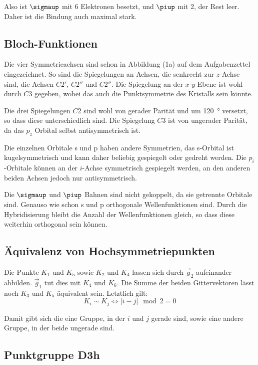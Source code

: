 Also ist $\sigmaup$ mit 6 Elektronen besetzt, und $\piup$ mit 2, der Rest leer.
Daher ist die Bindung auch maximal stark.

\subsection{Bloch-Funktionen}

Die vier Symmetrieachsen sind schon in Abbildung (1a) auf dem Aufgabenzettel
eingezeichnet. So sind die Spiegelungen an Achsen, die senkrecht zur $z$-Achse
sind, die Achsen $C2'$, $C2''$ und $C2''$. Die Spiegelung an der $x$-$y$-Ebene
ist wohl durch $C3$ gegeben, wobei das auch die Punktsymmetrie des Kristalls
sein könnte.

Die drei Spiegelungen $C2$ sind wohl von gerader Parität und um
\SI{120}{\degree} versetzt, so dass diese unterschiedlich sind. Die Spiegelung
$C3$ ist von ungerader Parität, da das $p_z$ Orbital selbst antisymmetrisch
ist.

Die einzelnen Orbitale s und p haben andere Symmetrien, das s-Orbital ist
kugelsymmetrisch und kann daher beliebig gespiegelt oder gedreht werden. Die
$p_i$-Orbitale können an der $i$-Achse symmetrisch gespiegelt werden, an den
anderen beiden Achsen jedoch nur antisymmetrisch.

Die $\sigmaup$ und $\piup$ Bahnen sind nicht gekoppelt, da sie getrennte
Orbitale sind. Genauso wie schon s und p orthogonale Wellenfunktionen sind.
Durch die Hybridisierung bleibt die Anzahl der Wellenfunktionen gleich, so dass
diese weiterhin orthogonal sein können.

\subsection{Äquivalenz von Hochsymmetriepunkten}

Die Punkte $K_1$ und $K_5$ sowie $K_2$ und $K_4$ lassen sich durch $\vec g_2$
aufeinander abbilden. $\vec g_1$ tut dies mit $K_4$ und $K_6$. Die Summe der
beiden Gittervektoren lässt noch $K_3$ und $K_5$ äquivalent sein. Letztlich
gilt:
\[
	K_i \sim K_j
	\iff
	|i - j| \mod 2 = 0
\]

Damit gibt sich die eine Gruppe, in der $i$ und $j$ gerade sind, sowie eine
andere Gruppe, in der beide ungerade sind.

\subsection{Punktgruppe D3h}

